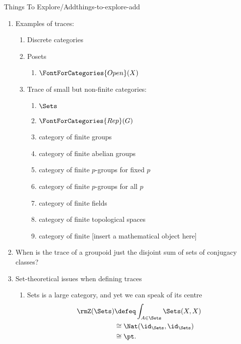 \begin{remark}{Things To Explore/Add}{things-to-explore-add}
\begin{enumerate}
        \item Examples of traces:
            \begin{enumerate}
                \item Discrete categories
                \item Posets
                    \begin{enumerate}
                        \item $\FontForCategories{Open}(X)$
                    \end{enumerate}
                \item Trace of small but non-finite categories:
                    \begin{enumerate}
                        \item $\Sets$
                        \item $\FontForCategories{Rep}(G)$
                        \item category of finite groups
                        \item category of finite abelian groups
                        \item category of finite $p$-groups for fixed $p$
                        \item category of finite $p$-groups for all $p$
                        \item category of finite fields
                        \item category of finite topological spaces
                        \item category of finite [insert a mathematical object here]
                    \end{enumerate}
            \end{enumerate}
        \item When is the trace of a groupoid just the disjoint sum of sets of conjugacy classes?
        \item Set-theoretical issues when defining traces
            \begin{enumerate}
                \item Sets is a large category, and yet we can speak of its centre
                    \begin{align*}
                        \rmZ(\Sets) &\defeq \int_{A\in\Sets}\Sets(X,X)\\%
                                    &\cong  \Nat(\id_{\Sets},\id_{\Sets})\\
                                    &\cong  \pt.
                    \end{align*}

\end{enumerate}
\end{enumerate}
\end{remark}
